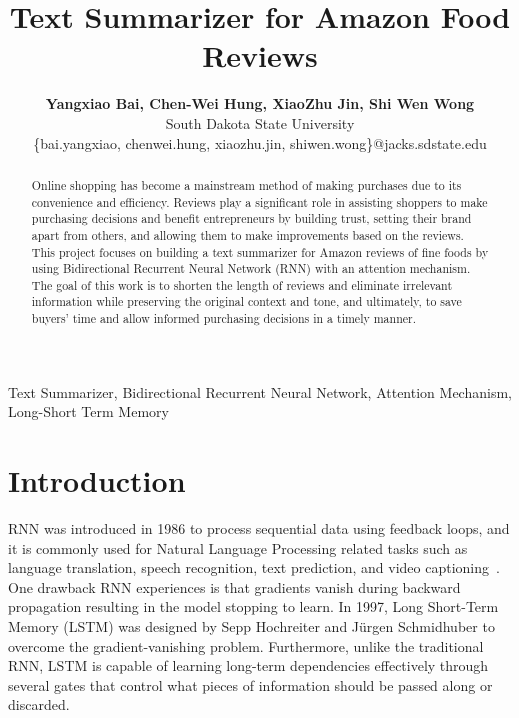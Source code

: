 \documentclass[conference]{IEEEtran}
\begin{document}
\title{\textbf{Text Summarizer for Amazon Food Reviews}\\}
\author{\textbf{\Large{Yangxiao Bai, Chen-Wei Hung, XiaoZhu Jin, Shi Wen Wong}} \\
South Dakota State University \\
\{bai.yangxiao, chenwei.hung, xiaozhu.jin, shiwen.wong\}@jacks.sdstate.edu \\
}

\maketitle

\begin{abstract}
Online shopping has become a mainstream method of making purchases due to its convenience and efficiency. Reviews play a significant role in assisting shoppers to make purchasing decisions and benefit entrepreneurs by building trust, setting their brand apart from others, and allowing them to make improvements based on the reviews. This project focuses on building a text summarizer for Amazon reviews of fine foods by using Bidirectional Recurrent Neural Network (RNN) with an attention mechanism. The goal of this work is to shorten the length of reviews and eliminate irrelevant information while preserving the original context and tone, and ultimately, to save buyers’ time and allow informed purchasing decisions in a timely manner. 
\end{abstract} 

\begin{IEEEkeywords}
Text Summarizer, Bidirectional Recurrent Neural Network, Attention Mechanism, Long-Short Term Memory
\end{IEEEkeywords}

\section{Introduction}
RNN was introduced in 1986 to process sequential data using feedback loops, and it is commonly used for Natural Language Processing related tasks such as language translation, speech recognition, text prediction, and video captioning~\cite{staudemeyer2019understanding}. One drawback RNN experiences is that gradients vanish during backward propagation resulting in the model stopping to learn. In 1997, Long Short-Term Memory (LSTM) was designed by Sepp Hochreiter and J\"{u}rgen Schmidhuber to overcome the gradient-vanishing problem. Furthermore, unlike the traditional RNN, LSTM is capable of learning long-term dependencies effectively through several gates that control what pieces of information should be passed along or discarded. \\ \\
\end{document}
